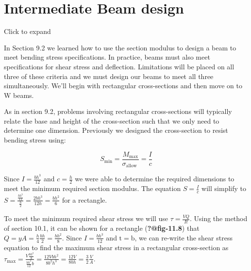 \documentclass[
  letterpaper,
  DIV=11,
  numbers=noendperiod]{scrreprt}
\begin{document}
\section{Intermediate Beam design}\label{sec-11.5}

Click to expand

In Section 9.2 we learned how to use the section modulus to design a
beam to meet bending stress specifications. In practice, beams must also
meet specifications for shear stress and deflection. Limitations will be
placed on all three of these criteria and we must design our beams to
meet all three simultaneously. We'll begin with rectangular
cross-sections and then move on to W beams.

As in section 9.2, problems involving rectangular cross-sections will
typically relate the base and height of the cross-section such that we
only need to determine one dimension. Previously we designed the
cross-section to resist bending stress using:

\[
S_{\min }=\frac{M_{\max }}{\sigma_{\text {allow }}}=\frac{I}{c}
\]

Since \(I=\frac{b h^{3}}{12}\) and \(c=\frac{h}{2}\) we were able to
determine the required dimensions to meet the minimum required section
modulus. The equation \(S=\frac{I}{c}\) will simplify to
\(S=\frac{\frac{b h^{3}}{12}}{\frac{h}{2}}=\frac{2 b h^{3}}{12 h}=\frac{b h^{2}}{6}\)
for a rectangle.

To meet the minimum required shear stress we will use
\(\tau=\frac{V Q}{I t}\). Using the method of section 10.1, it can be
shown for a rectangle (\textbf{?@fig-11.8}) that
\(Q=y A=\frac{h}{4} \frac{b h}{2}=\frac{b h^{2}}{8}\). Since
\(I=\frac{b h^{3}}{12}\) and \(\mathrm{t}=\mathrm{b}\), we can re-write
the shear stress equation to find the maximum shear stress in a
rectangular cross-section as
\(\tau_{\max }=\frac{V \frac{b h^{2}}{8}}{\frac{b h^{3}}{12} b}=\frac{12 V b h^{2}}{8 b^{2} h^{3}}=\frac{12 V}{8 b h}=\frac{3}{2} \frac{V}{A}\).
\end{document}
